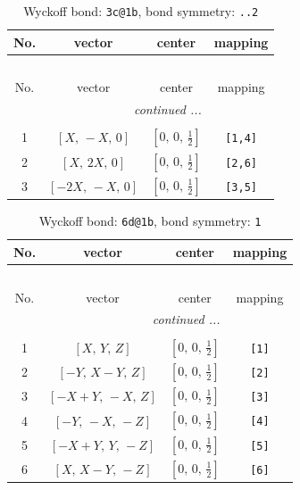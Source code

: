 \documentclass[fleqn,8pt]{jsarticle}
\begin{document}
\begin{longtable}{cccc}
\caption{Wyckoff bond: {\tt 3c@1b}, bond symmetry: {\tt ..2}}
 \\
 \hline \hline
No. & vector & center & mapping \\ \hline \endfirsthead

\multicolumn{3}{l}{\tablename\ \thetable{}} \\
 \hline \hline
No. & vector & center & mapping \\ \hline \endhead

 \hline \hline
\multicolumn{3}{r}{\footnotesize\it continued ...} \\ \endfoot

 \hline \hline
\multicolumn{3}{r}{} \\ \endlastfoot

1 & $\left[ X,\, - X,\, 0 \right]$ & $\left[ 0,\, 0,\, \frac{1}{2} \right]$ & {\tt [1,4]} \\ \hline
2 & $\left[ X,\, 2 X,\, 0 \right]$ & $\left[ 0,\, 0,\, \frac{1}{2} \right]$ & {\tt [2,6]} \\ \hline
3 & $\left[ - 2 X,\, - X,\, 0 \right]$ & $\left[ 0,\, 0,\, \frac{1}{2} \right]$ & {\tt [3,5]} \\
\end{longtable}
\renewcommand{\arraystretch}{1.2}
\begin{longtable}{cccc}
\caption{Wyckoff bond: {\tt 6d@1b}, bond symmetry: {\tt 1}}
 \\
 \hline \hline
No. & vector & center & mapping \\ \hline \endfirsthead

\multicolumn{3}{l}{\tablename\ \thetable{}} \\
 \hline \hline
No. & vector & center & mapping \\ \hline \endhead

 \hline \hline
\multicolumn{3}{r}{\footnotesize\it continued ...} \\ \endfoot

 \hline \hline
\multicolumn{3}{r}{} \\ \endlastfoot

1 & $\left[ X,\, Y,\, Z \right]$ & $\left[ 0,\, 0,\, \frac{1}{2} \right]$ & {\tt [1]} \\ \hline
2 & $\left[ - Y,\, X - Y,\, Z \right]$ & $\left[ 0,\, 0,\, \frac{1}{2} \right]$ & {\tt [2]} \\ \hline
3 & $\left[ - X + Y,\, - X,\, Z \right]$ & $\left[ 0,\, 0,\, \frac{1}{2} \right]$ & {\tt [3]} \\ \hline
4 & $\left[ - Y,\, - X,\, - Z \right]$ & $\left[ 0,\, 0,\, \frac{1}{2} \right]$ & {\tt [4]} \\ \hline
5 & $\left[ - X + Y,\, Y,\, - Z \right]$ & $\left[ 0,\, 0,\, \frac{1}{2} \right]$ & {\tt [5]} \\ \hline
6 & $\left[ X,\, X - Y,\, - Z \right]$ & $\left[ 0,\, 0,\, \frac{1}{2} \right]$ & {\tt [6]} \\
\end{longtable}
\end{document}
